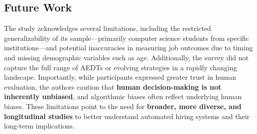 \subsection{Future Work}
The study acknowledges several limitations, including the restricted generalizability of its sample—primarily computer science students from specific institutions—and potential inaccuracies in measuring job outcomes due to timing and missing demographic variables such as age. Additionally, the survey did not capture the full range of AEDTs or evolving strategies in a rapidly changing landscape. Importantly, while participants expressed greater trust in human evaluation, the authors caution that \textbf{human decision-making is not inherently unbiased}, and algorithmic biases often reflect underlying human biases. These limitations point to the need for \textbf{broader, more diverse, and longitudinal studies} to better understand automated hiring systems and their long-term implications.